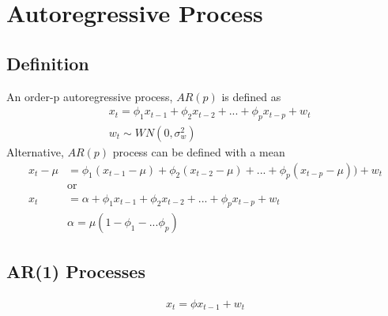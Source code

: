 \section{Autoregressive Process}

\subsection{Definition}
An order-p autoregressive process, $AR(p)$ is defined as 
    \begin{align*}
        & x_t = \phi_1 x_{t-1} + \phi_2 x_{t-2} + ... + \phi_p x_{t-p} + w_t \\
        & w_t \sim WN(0, \sigma_w^2)
    \end{align*}
Alternative, $AR(p)$ process can be defined with a mean 
    \begin{align*}
        x_t - \mu 
        & = \phi_1 (x_{t-1}-\mu) + \phi_2 (x_{t-2}-\mu) + ... + \phi_p (x_{t-p}-\mu)) + w_t \\
        & \textrm{or} \\
        x_t
        & = \alpha + \phi_1 x_{t-1} + \phi_2 x_{t-2} + ... + \phi_p x_{t-p} + w_t \\
        & \alpha = \mu (1 - \phi_1 - ... \phi_p)
    \end{align*}


\subsection{AR(1) Processes}
    \begin{align*}
        x_t = \phi x_{t-1} + w_t
    \end{align*}

